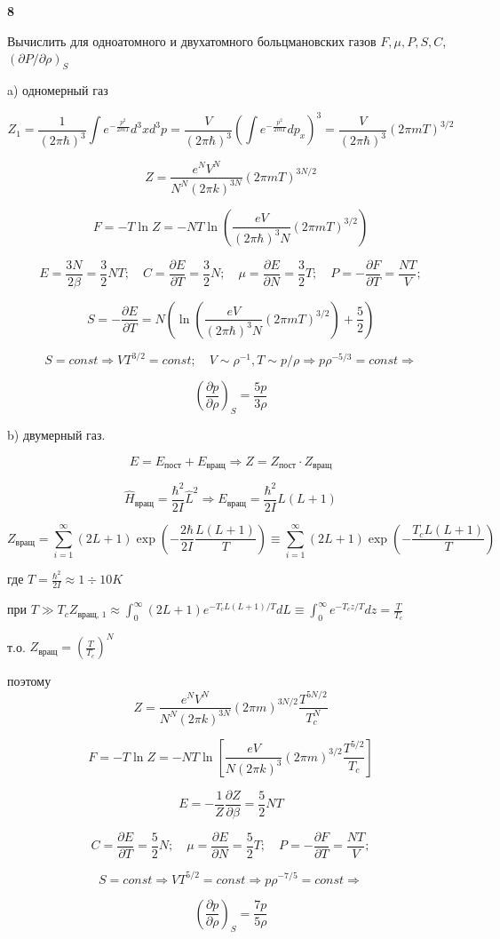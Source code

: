 \documentclass[a4paper,12pt]{article} %
\newcommand{\parder}[2]{\frac{\partial {#1}}{\partial {#2}}}
\begin{document}
\begin{ttask}\textbf{8}

Вычислить для одноатомного и двухатомного больцмановских газов 
$ F, \mu, P, S, C$, $(\partial P/\partial \rho)_{S}$


a) одномерный газ



\[ Z_1=\frac{1}{(2\pi\hbar)^3}\int e^{-\frac{p^2}{2mT}}d^3 xd^3 p=\frac{V}{(2\pi\hbar)^3} \left(\int e^{-\frac{p^2}{2mT}}dp_x\right)^3=
	\frac{V}{(2\pi\hbar)^3} (2\pi m T)^{3/2}\]

\[ Z=\frac{e^{N} V^{N}}{N^{N}(2 \pi k)^{3 N}}(2 \pi m T)^{3 N / 2} \]

\[ F=-T\ln Z =-NT\ln \left( \frac{eV}{(2\pi\hbar)^3 N}(2\pi m T)^{3/2} \right)\]

\[ E=\frac{3N}{2\beta}=\frac{3}{2}NT; \quad
C=\parder{E}{T}=\frac{3}{2}N; \quad 
\mu=\parder{E}{N}=\frac{3}{2}T; \quad
P=-\parder{F}{T}=\frac{NT}{V};\]

\[ S=-\parder{E}{T}=N\left( \ln\left( \frac{eV}{(2\pi\hbar)^3 N}(2\pi m T)^{3/2} \right)+\frac{5}{2} \right) \]


\[S = const  \Rightarrow
VT^{3/2}= const; \quad V\sim \rho^{-1}, T\sim p/\rho \Rightarrow p \rho^{-5/3} = const  \Rightarrow \]


\[ \left( \parder{p}{\rho}\right)_S =\frac{5p}{3\rho} \]




b) двумерный газ.

\[ E= E_\text{пост}+E_\text{вращ}
\Rightarrow  
Z= Z_\text{пост}\cdot Z_\text{вращ}\]


\[ 
\hat{H}_\text{вращ}=
\frac{\hbar^2}{2I} \hat{L}^2 \Rightarrow E_\text{вращ}= 
\frac{\hbar^2}{2I} L(L+1)  
\]

\[ Z_\text{вращ} =\sum_{i=1}^{\infty}(2L+1)\exp \left(-\frac{2\hbar}{2I} \frac{L(L+1)}{T}  \right) \equiv
\sum_{i=1}^{\infty}(2L+1)\exp \left(-\frac{T_c L(L+1)}{T}  \right)
\]

где $ T=\frac{\hbar^2}{2I}\approx 1\div 10 K $


при $ T\gg T_c  Z_\text{вращ, 1}\approx \int_{0}^{\infty}(2L+1) e^{-T_c L(L+1)/T}dL\equiv \int_{0}^{\infty}e^{-T_c z/T} dz =\frac{T}{T_c}$

т.о. $ Z_\text{вращ}= \left(\frac{T}{T_c}\right)^N$

поэтому 
\[ Z=\frac{e^{N} V^{N}}{N^{N}(2 \pi k)^{3 N}}(2 \pi m )^{3 N / 2} \frac{T^{5N/2}}{T_c^N}\]


\[ F= -T\ln Z= -N T\ln \left[ \frac{e V}{N (2 \pi k)^{3 }}(2 \pi m )^{3 / 2} \frac{T^{5/2}}{T_c}  \right] \]

\[ E= -\frac{1}{Z} \parder{Z}{\beta}=\frac{5}{2}NT \]

\[ C=\parder{E}{T}=\frac{5}{2}N; \quad 
\mu=\parder{E}{N}=\frac{5}{2}T; \quad
P=-\parder{F}{T}=\frac{NT}{V};\]

\[S = const  \Rightarrow
VT^{5/2}= const \Rightarrow p \rho^{-7/5} = const  \Rightarrow \]


\[ \left( \parder{p}{\rho}\right)_S =\frac{7p}{5\rho} \]



\end{ttask}
\end{document}
